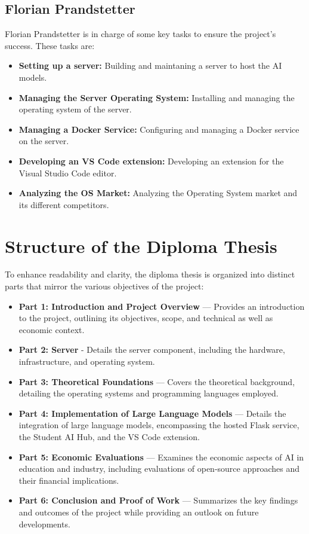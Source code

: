 \subsection{Florian Prandstetter}
\label{sec:Florina-Prandstetter}

Florian Prandstetter is in charge of some key tasks to ensure the project's success.
These tasks are:

\begin{itemize}
    \item \textbf{Setting up a server:} Building and maintaning a server to host the AI models.
    \item \textbf{Managing the Server Operating System:} Installing and managing the operating system of the server.
    \item \textbf{Managing a Docker Service:} Configuring and managing a Docker service on the server.
    \item \textbf{Developing an VS Code extension:} Developing an extension for the Visual Studio Code editor.
    \item \textbf{Analyzing the OS Market:} Analyzing the Operating System market and its different competitors.
\end{itemize}

\section{Structure of the Diploma Thesis}

To enhance readability and clarity, the diploma thesis is organized into distinct parts that mirror the various objectives of the project:

\begin{itemize}
    \item \textbf{Part 1: Introduction and Project Overview} — Provides an introduction to the project, outlining its objectives, scope, and technical as well as economic context.
    \item \textbf{Part 2: Server} - Details the server component, including the hardware, infrastructure, and operating system.
    \item \textbf{Part 3: Theoretical Foundations} — Covers the theoretical background, detailing the operating systems and programming languages employed.
    \item \textbf{Part 4: Implementation of Large Language Models} — Details the integration of large language models, encompassing the hosted Flask service, the Student AI Hub, and the VS Code extension.
    \item \textbf{Part 5: Economic Evaluations} — Examines the economic aspects of AI in education and industry, including evaluations of open-source approaches and their financial implications.
    \item \textbf{Part 6: Conclusion and Proof of Work} — Summarizes the key findings and outcomes of the project while providing an outlook on future developments.
\end{itemize}

